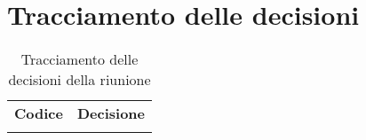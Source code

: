 \clearpage
\section{Tracciamento delle decisioni}
\begin{center}
	\renewcommand{\arraystretch}{1.5}
	\begin{longtable}{  p{2.8cm} p{11.4cm} }
		\rowcolor{tableHeadYellow}
		\textbf{Codice}&\textbf{Decisione}\\
		
		\rowcolor{white}
		\caption{Tracciamento delle decisioni della riunione}
	\end{longtable}	
\end{center}